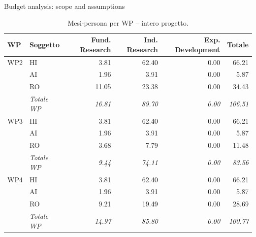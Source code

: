 \documentclass[aspectratio=169,11pt]{beamer}
\begin{document}
\begin{frame}{Budget analysis: scope and assumptions}


\begin{table}[H]\centering\scriptsize\caption{Mesi-persona per WP -- intero progetto.}\label{tab:wp-w-tot}
\begin{tabular}{llrrrr}\toprule\textbf{WP} & \textbf{Soggetto} & \textbf{Fund. Research} & \textbf{Ind. Research} & \textbf{Exp. Development} & \textbf{Totale} \\\midrule
WP2 & HI & 3.81 & 62.40 & 0.00 & 66.21 \\
 & AI & 1.96 & 3.91 & 0.00 & 5.87 \\
 & RO & 11.05 & 23.38 & 0.00 & 34.43 \\
 & \textit{Totale WP} & \textit{16.81} & \textit{89.70} & \textit{0.00} & \textit{106.51} \\\midrule
WP3 & HI & 3.81 & 62.40 & 0.00 & 66.21 \\
 & AI & 1.96 & 3.91 & 0.00 & 5.87 \\
 & RO & 3.68 & 7.79 & 0.00 & 11.48 \\
 & \textit{Totale WP} & \textit{9.44} & \textit{74.11} & \textit{0.00} & \textit{83.56} \\\midrule
WP4 & HI & 3.81 & 62.40 & 0.00 & 66.21 \\
 & AI & 1.96 & 3.91 & 0.00 & 5.87 \\
 & RO & 9.21 & 19.49 & 0.00 & 28.69 \\
 & \textit{Totale WP} & \textit{14.97} & \textit{85.80} & \textit{0.00} & \textit{100.77} \\
\bottomrule\end{tabular}
\end{table}

\end{frame}
\end{document}
